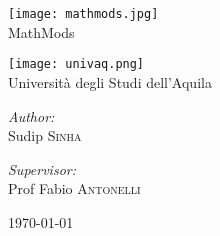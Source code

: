 \begin{titlepage}
	\begin{center}

		\begin{minipage}[c]{0.45\textwidth}
			\begin{center}
				\texttt{[image: mathmods.jpg]} \\
				\LARGE{MathMods}
			\end{center}
		\end{minipage}
		\begin{minipage}[c]{0.45\textwidth}
			\begin{center}
				\texttt{[image: univaq.png]} \\
				\Large{Università degli Studi dell'Aquila}
			\end{center}
		\end{minipage}

		

		\vfill

		\noindent
		\begin{minipage}[t]{0.4\textwidth}
			\begin{flushleft} \large
				\emph{Author:}\\
				Sudip \textsc{Sinha}
			\end{flushleft}
		\end{minipage}
		\begin{minipage}[t]{0.4\textwidth}
			\begin{flushright} \large
				\emph{Supervisor:} \\
				Prof Fabio \textsc{Antonelli}
			\end{flushright}
		\end{minipage}

		\vfill

		{\large \today}

	\end{center}
\end{titlepage}

